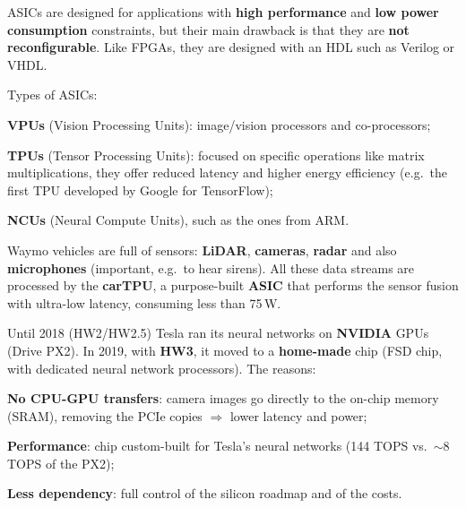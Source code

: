 ASICs are designed for applications with \textbf{high performance} and \textbf{low power consumption} constraints, but their main drawback is that they are \textbf{not reconfigurable}.
Like FPGAs, they are designed with an HDL such as Verilog or VHDL.

Types of ASICs:
\begin{compactitemize}
    \item \textbf{VPUs} (Vision Processing Units): image/vision processors and co-processors;
    \item \textbf{TPUs} (Tensor Processing Units): focused on specific operations like matrix multiplications, they offer reduced latency and higher energy efficiency (e.g.\ the first TPU developed by Google for TensorFlow);
    \item \textbf{NCUs} (Neural Compute Units), such as the ones from ARM.
\end{compactitemize}

\begin{infobox}[Waymo]
Waymo vehicles are full of sensors: \textbf{LiDAR}, \textbf{cameras}, \textbf{radar} and also \textbf{microphones} (important, e.g.\ to hear sirens).
All these data streams are processed by the \textbf{carTPU}, a purpose-built \textbf{ASIC} that performs the sensor fusion with ultra-low latency, consuming less than 75\,W.
\end{infobox}

\begin{infobox}[Tesla]
Until 2018 (HW2/HW2.5) Tesla ran its neural networks on \textbf{NVIDIA} GPUs (Drive PX2). In 2019, with \textbf{HW3}, it moved to a \textbf{home-made} chip (FSD chip, with dedicated neural network processors). The reasons:
\begin{compactitemize}
    \item \textbf{No CPU-GPU transfers}: camera images go directly to the on-chip memory (SRAM), removing the PCIe copies $\Rightarrow$ lower latency and power;
    \item \textbf{Performance}: chip custom-built for Tesla's neural networks (144 TOPS vs.\ $\sim$8 TOPS of the PX2);
    \item \textbf{Less dependency}: full control of the silicon roadmap and of the costs.
\end{compactitemize}
\end{infobox}

